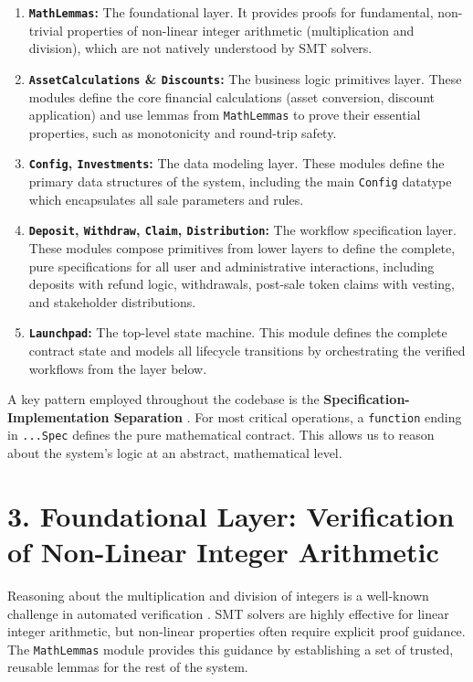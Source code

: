 \documentclass[
  english,
  onecolumn]{article}
\providecommand{\tightlist}{%
  \setlength{\itemsep}{0pt}\setlength{\parskip}{0pt}}
\begin{document}
\begin{enumerate}
\def\labelenumi{\arabic{enumi}.}
\tightlist
\item
  \textbf{\texttt{MathLemmas}:} The foundational layer. It provides
  proofs for fundamental, non-trivial properties of non-linear integer
  arithmetic (multiplication and division), which are not natively
  understood by SMT solvers.
\item
  \textbf{\texttt{AssetCalculations} \& \texttt{Discounts}:} The
  business logic primitives layer. These modules define the core
  financial calculations (asset conversion, discount application) and
  use lemmas from \texttt{MathLemmas} to prove their essential
  properties, such as monotonicity and round-trip safety.
\item
  \textbf{\texttt{Config}, \texttt{Investments}:} The data modeling
  layer. These modules define the primary data structures of the system,
  including the main \texttt{Config} datatype which encapsulates all
  sale parameters and rules.
\item
  \textbf{\texttt{Deposit}, \texttt{Withdraw}, \texttt{Claim},
  \texttt{Distribution}:} The workflow specification layer. These
  modules compose primitives from lower layers to define the complete,
  pure specifications for all user and administrative interactions,
  including deposits with refund logic, withdrawals, post-sale token
  claims with vesting, and stakeholder distributions.
\item
  \textbf{\texttt{Launchpad}:} The top-level state machine. This module
  defines the complete contract state and models all lifecycle
  transitions by orchestrating the verified workflows from the layer
  below.
\end{enumerate}

A key pattern employed throughout the codebase is the
\textbf{Specification-Implementation Separation}
\citep{leino2017tutorial}. For most critical operations, a
\texttt{function} ending in \texttt{...Spec} defines the pure
mathematical contract. This allows us to reason about the system's logic
at an abstract, mathematical level.

\section{3. Foundational Layer: Verification of Non-Linear Integer
Arithmetic}\label{foundational-layer-verification-of-non-linear-integer-arithmetic}

Reasoning about the multiplication and division of integers is a
well-known challenge in automated verification
\citep{monniaux2008pitfalls, audemard2021certified}. SMT solvers are
highly effective for linear integer arithmetic, but non-linear
properties often require explicit proof guidance. The
\texttt{MathLemmas} module provides this guidance by establishing a set
of trusted, reusable lemmas for the rest of the system.
\end{document}
